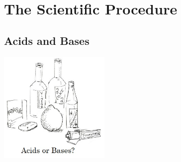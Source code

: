 \section{The Scientific Procedure}



\subsection{Acids and Bases}

\begin{center}
\includegraphics[width=0.4\textwidth]{./img/source/acids-bases-sci-meth.jpg}
\end{center}


